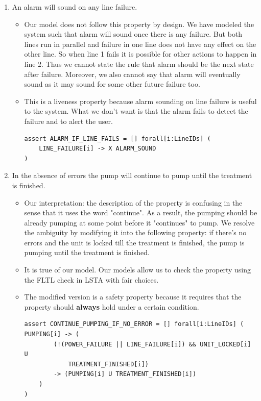 \documentclass[titlepage]{article}
\begin{document}
\begin{enumerate}
\item An alarm will sound on any line failure.
    \begin{itemize}
        \item Our model does not follow this property by design. We have modeled the system such that alarm will sound once there is any failure. But both lines run in parallel and failure in one line does not have any effect on the other line. So when line 1 fails it is possible for other actions to happen in line 2. Thus we cannot state the rule that alarm should be the next state after failure. Moreover, we also cannot say that alarm will eventually sound as it may sound for some other future failure too.
        \item This is a liveness property because alarm sounding on line failure is useful to the system. What we don't want is that the alarm fails to detect the failure and to alert the user.
            \begin{verbatim}
assert ALARM_IF_LINE_FAILS = [] forall[i:LineIDs] (
    LINE_FAILURE[i] -> X ALARM_SOUND
)
            \end{verbatim}
    \end{itemize}

\item In the absence of errors the pump will continue to pump until the treatment is finished.
    \begin{itemize}
        \item Our interpretation: the description of the property is confusing in the sense that it uses the word "continue". As a result, the pumping should be already pumping at some point before it "continues" to pump. We resolve the ambiguity by modifying it into the following property: if there's no errors and the unit is locked till the treatment is finished, the pump is pumping until the treatment is finished.
        \item It is true of our model. Our models allow us to check the property using the FLTL check in LSTA with fair choices.
        \item The modified version is a safety property because it requires that the property should \textbf{always} hold under a certain condition.
            \begin{verbatim}
assert CONTINUE_PUMPING_IF_NO_ERROR = [] forall[i:LineIDs] (
PUMPING[i] -> (
        (!(POWER_FAILURE || LINE_FAILURE[i]) && UNIT_LOCKED[i] U 
            TREATMENT_FINISHED[i])
        -> (PUMPING[i] U TREATMENT_FINISHED[i])
    )
)
            \end{verbatim}
        \end{itemize}
        

\end{enumerate}
\end{document}

